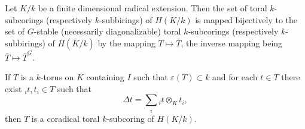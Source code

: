 Let $K/k$ be a finite dimensional radical extension. Then the set of toral $k$-subcorings (respectively $k$-subbirings) of $H(K/k)$ is mapped bijectively to the set of $G$-stable (necessarily diagonalizable) toral $k$-subcorings (respectively $k$-subbirings) of $H(\bar{K}/k)$ by the mapping $T \mapsto \bar{T}$, the inverse mapping being $\bar{T} \mapsto \bar{T}^G$.

If $T$ is a $k$-torus on $K$ containing $I$ such that $\varepsilon(T) \subset k$ and for each $t \in T$ there exist ${}_i t, t_i \in T$ such that
$$\Delta t = \sum_i {}_i t \otimes_K t_i,$$
then $T$ is a coradical toral $k$-subcoring of $H(K/k)$.
